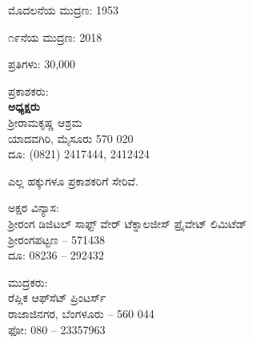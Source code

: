 \thispagestyle{empty}

\begin{flushleft}
ಮೊದಲನೆಯ ಮುದ್ರಣ: 1953
\end{flushleft}

\vfill

\begin{flushleft}
೧೯ನೆಯ ಮುದ್ರಣ: 2018
\end{flushleft}

\vfill

\begin{flushleft}
ಪ್ರತಿಗಳು: 30,000
\end{flushleft}

\vfill


\vfill

\begin{flushleft}
ಪ್ರಕಾಶಕರು:\\\textbf{ಅಧ್ಯಕ್ಷರು}\\ಶ‍್ರೀರಾಮಕೃಷ್ಣ ಆಶ್ರಮ\\ಯಾದವಗಿರಿ, ಮೈಸೂರು 570 020\\ದೂ: (0821) 2417444, 2412424
\end{flushleft}

\vfill

\begin{flushleft}
 ಎಲ್ಲ ಹಕ್ಕುಗಳೂ ಪ್ರಕಾಶಕರಿಗೆ ಸೇರಿವೆ. 
\end{flushleft}

\vfill

\begin{flushleft}
ಅಕ್ಷರ ವಿನ್ಯಾಸ:\\ಶ‍್ರೀರಂಗ ಡಿಜಿಟಲ್ ಸಾಫ್ಟ್ ‍ವೇರ್ ಟೆಕ್ನಾಲಜೀಸ್ ಪ್ರೈವೇಟ್ ಲಿಮಿಟೆಡ್\\ಶ‍್ರೀರಂಗಪಟ್ಟಣ – 571438\\ದೂ: 08236 – 292432
\end{flushleft}

\vfill

\begin{flushleft}
ಮುದ್ರಕರು:\\ರೆಪ್ಲಿಕ ಆಫ್‍ಸೆಟ್ ಪ್ರಿಂಟರ್ಸ್\\ರಾಜಾಜಿನಗರ, ಬೆಂಗಳೂರು – 560 044\\ಫೋ: 080 – 23357963
\end{flushleft}

